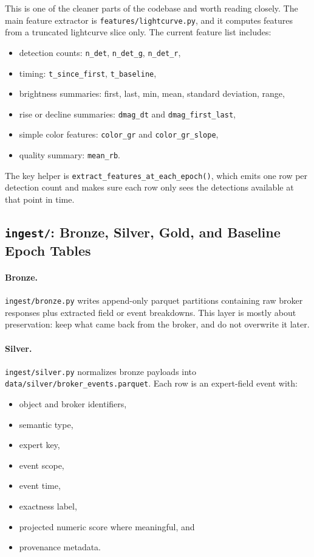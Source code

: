 \documentclass[11pt]{article}
\newcommand{\code}[1]{\texttt{#1}}
\begin{document}
This is one of the cleaner parts of the codebase and worth reading closely. The main feature extractor is \code{features/lightcurve.py}, and it computes features from a truncated lightcurve slice only. The current feature list includes:

\begin{itemize}
\item detection counts: \code{n\_det}, \code{n\_det\_g}, \code{n\_det\_r},
\item timing: \code{t\_since\_first}, \code{t\_baseline},
\item brightness summaries: first, last, min, mean, standard deviation, range,
\item rise or decline summaries: \code{dmag\_dt} and \code{dmag\_first\_last},
\item simple color features: \code{color\_gr} and \code{color\_gr\_slope},
\item quality summary: \code{mean\_rb}.
\end{itemize}

The key helper is \code{extract\_features\_at\_each\_epoch()}, which emits one row per detection count and makes sure each row only sees the detections available at that point in time.

\subsection{\code{ingest/}: Bronze, Silver, Gold, and Baseline Epoch Tables}

\paragraph{Bronze.}
\code{ingest/bronze.py} writes append-only parquet partitions containing raw broker responses plus extracted field or event breakdowns. This layer is mostly about preservation: keep what came back from the broker, and do not overwrite it later.

\paragraph{Silver.}
\code{ingest/silver.py} normalizes bronze payloads into \code{data/silver/broker\_events.parquet}. Each row is an expert-field event with:

\begin{itemize}
\item object and broker identifiers,
\item semantic type,
\item expert key,
\item event scope,
\item event time,
\item exactness label,
\item projected numeric score where meaningful, and
\item provenance metadata.
\end{itemize}
\end{document}
